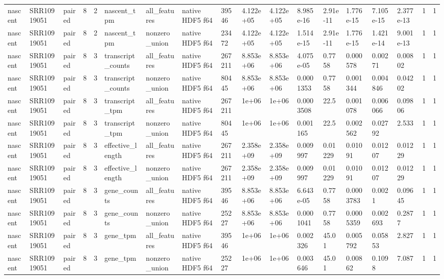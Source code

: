 \begin{tabular}{llllllllllllllllll}
nascent & SRR10919051 & paired & 8 & 2 & nascent\_tpm & all\_features & native HDF5 f64 & 39546 & 4.122e+05 & 4.122e+05 & 8.985e-16 & 2.91e-11 & 1.776e-15 & 7.105e-15 & 2.377e-13 & 1 & 1 \\
nascent & SRR10919051 & paired & 8 & 2 & nascent\_tpm & nonzero\_union & native HDF5 f64 & 23472 & 4.122e+05 & 4.122e+05 & 1.514e-15 & 2.91e-11 & 1.776e-15 & 1.421e-14 & 9.001e-13 & 1 & 1 \\
nascent & SRR10919051 & paired & 8 & 3 & transcript\_counts & all\_features & native HDF5 f64 & 267211 & 8.853e+06 & 8.853e+06 & 4.075e-05 & 0.7758 & 0.000578 & 0.00271 & 0.00802 & 1 & 1 \\
nascent & SRR10919051 & paired & 8 & 3 & transcript\_counts & nonzero\_union & native HDF5 f64 & 80445 & 8.853e+06 & 8.853e+06 & 0.0001353 & 0.7758 & 0.001344 & 0.004846 & 0.04202 & 1 & 1 \\
nascent & SRR10919051 & paired & 8 & 3 & transcript\_tpm & all\_features & native HDF5 f64 & 267211 & 1e+06 & 1e+06 & 0.0003508 & 22.5 & 0.001078 & 0.006066 & 0.09806 & 1 & 1 \\
nascent & SRR10919051 & paired & 8 & 3 & transcript\_tpm & nonzero\_union & native HDF5 f64 & 80445 & 1e+06 & 1e+06 & 0.001165 & 22.5 & 0.002562 & 0.02792 & 2.533 & 1 & 1 \\
nascent & SRR10919051 & paired & 8 & 3 & effective\_length & all\_features & native HDF5 f64 & 267211 & 2.358e+09 & 2.358e+09 & 0.009997 & 0.01229 & 0.01091 & 0.01207 & 0.01229 & 1 & 1 \\
nascent & SRR10919051 & paired & 8 & 3 & effective\_length & nonzero\_union & native HDF5 f64 & 267211 & 2.358e+09 & 2.358e+09 & 0.009997 & 0.01229 & 0.01091 & 0.01207 & 0.01229 & 1 & 1 \\
nascent & SRR10919051 & paired & 8 & 3 & gene\_counts & all\_features & native HDF5 f64 & 39546 & 8.853e+06 & 8.853e+06 & 6.643e-05 & 0.7758 & 0.0003783 & 0.0021 & 0.09645 & 1 & 1 \\
nascent & SRR10919051 & paired & 8 & 3 & gene\_counts & nonzero\_union & native HDF5 f64 & 25227 & 8.853e+06 & 8.853e+06 & 0.0001041 & 0.7758 & 0.0005359 & 0.002693 & 0.2877 & 1 & 1 \\
nascent & SRR10919051 & paired & 8 & 3 & gene\_tpm & all\_features & native HDF5 f64 & 39546 & 1e+06 & 1e+06 & 0.002326 & 45.01 & 0.005792 & 0.05853 & 2.827 & 1 & 1 \\
nascent & SRR10919051 & paired & 8 & 3 & gene\_tpm & nonzero\_union & native HDF5 f64 & 25227 & 1e+06 & 1e+06 & 0.003646 & 45.01 & 0.00862 & 0.1098 & 7.087 & 1 & 1 \\

\end{tabular}
